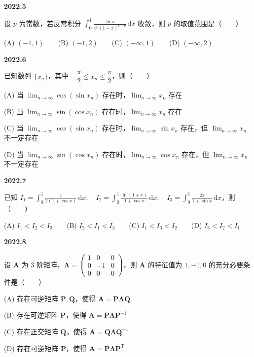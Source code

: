 \documentclass[UTF8,12pt,fontset=windows]{ctexart}
\begin{document}
\vfill
\newpage
{\large\bfseries 2022.5}

设 $p$ 为常数，若反常积分 $\int_{0}^{1}\frac{\ln x}{x^p(1-x)^{1-p}}\,\mathrm{d}x$ 收敛，则 $p$ 的取值范围是（　　）

(A) $(-1, 1)$　　(B) $(-1, 2)$　　(C) $(-\infty, 1)$　　(D) $(-\infty, 2)$

\vfill
\newpage
{\large\bfseries 2022.6}

已知数列 $\{x_n\}$，其中 $-\dfrac{\pi}{2} \leqslant x_n \leqslant \dfrac{\pi}{2}$，则（　　）

(A) 当 $\lim_{n\to\infty}\cos(\sin x_n)$ 存在时，$\lim_{n\to\infty} x_n$ 存在

(B) 当 $\lim_{n\to\infty}\sin(\cos x_n)$ 存在时，$\lim_{n\to\infty} x_n$ 存在

(C) 当 $\lim_{n\to\infty}\cos(\sin x_n)$ 存在时，$\lim_{n\to\infty}\sin x_n$ 存在，但 $\lim_{n\to\infty} x_n$ 不一定存在

(D) 当 $\lim_{n\to\infty}\sin(\cos x_n)$ 存在时，$\lim_{n\to\infty}\cos x_n$ 存在，但 $\lim_{n\to\infty} x_n$ 不一定存在

\vfill
\newpage
{\large\bfseries 2022.7}

已知 $I_1 = \int_{0}^{1}\frac{x}{2(1+\cos x)}\,\mathrm{d}x,\quad I_2 = \int_{0}^{1}\frac{\ln(1+x)}{1+\cos x}\,\mathrm{d}x,\quad I_3 = \int_{0}^{1}\frac{2x}{1+\sin x}\,\mathrm{d}x$，则（　　）

(A) $I_1 < I_2 < I_3$　　(B) $I_2 < I_1 < I_3$　　(C) $I_1 < I_3 < I_2$　　(D) $I_3 < I_2 < I_1$

\vfill
\newpage
{\large\bfseries 2022.8}

设 $\boldsymbol{A}$ 为 3 阶矩阵，$\boldsymbol{\Lambda} = \begin{pmatrix} 1 & 0 & 0 \\ 0 & -1 & 0 \\ 0 & 0 & 0 \end{pmatrix}$，则 $\boldsymbol{A}$ 的特征值为 $1, -1, 0$ 的充分必要条件是（　　）

(A) 存在可逆矩阵 $\boldsymbol{P}, \boldsymbol{Q}$，使得 $\boldsymbol{A} = \boldsymbol{P}\boldsymbol{\Lambda}\boldsymbol{Q}$

(B) 存在可逆矩阵 $\boldsymbol{P}$，使得 $\boldsymbol{A} = \boldsymbol{P}\boldsymbol{\Lambda}\boldsymbol{P}^{-1}$

(C) 存在正交矩阵 $\boldsymbol{Q}$，使得 $\boldsymbol{A} = \boldsymbol{Q}\boldsymbol{\Lambda}\boldsymbol{Q}^{-1}$

(D) 存在可逆矩阵 $\boldsymbol{P}$，使得 $\boldsymbol{A} = \boldsymbol{P}\boldsymbol{\Lambda}\boldsymbol{P}^{\mathrm{T}}$
\end{document}
